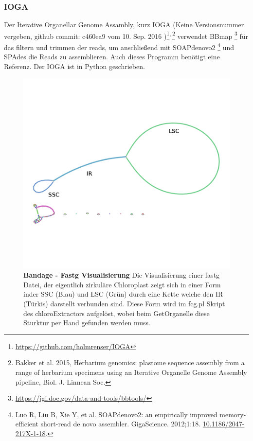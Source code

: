 \documentclass{scrartcl}
\begin{document}
\subsubsection{IOGA}
\label{sec-2-5-6}
Der Iterative Organellar Genome Assambly, kurz IOGA (Keine Versionsnummer vergeben, github commit: c460ea9 vom 10. Sep. 2016 )\footnote{\url{https://github.com/holmrenser/IOGA}}\textsuperscript{,}\,\footnote{Bakker et al. 2015, Herbarium genomics: plastome sequence assembly from a range of herbarium specimens using an Iterative Organelle Genome Assembly pipeline, Biol. J. Linnean Soc.} verwendet BBmap \footnote{\url{https://jgi.doe.gov/data-and-tools/bbtools/}} für das filtern und trimmen der reads, um anschließend mit 
SOAPdenovo2 \footnote{Luo R, Liu B, Xie Y, et al. SOAPdenovo2: an empirically improved memory-efficient short-read de novo assembler. GigaScience. 2012;1:18. \url{10.1186/2047-217X-1-18}.} und SPAdes \footnotemark[19]{} die Reads zu assemblieren. 
Auch dieses Programm benötigt eine Referenz. Der IOGA ist in Python geschrieben.
\begin{figure}
\includegraphics[width=.9\linewidth]{./graphCE_SRR1945473_1.png}
\caption[Bandage - Fastg Visualisierung]{\textbf{Bandage - Fastg Visualisierung} Die Visualisierung einer fastg Datei, der eigentlich zirkuläre Chloroplast zeigt sich in einer Form inder SSC (Blau) und LSC (Grün) durch eine Kette welche den IR (Türkis) darstellt verbunden sind. Diese Form wird im fcg.pl Skript des chloroExtractors aufgelöst, wobei beim GetOrganelle diese Sturktur per Hand gefunden werden muss.}
\end{figure}
\end{document}
